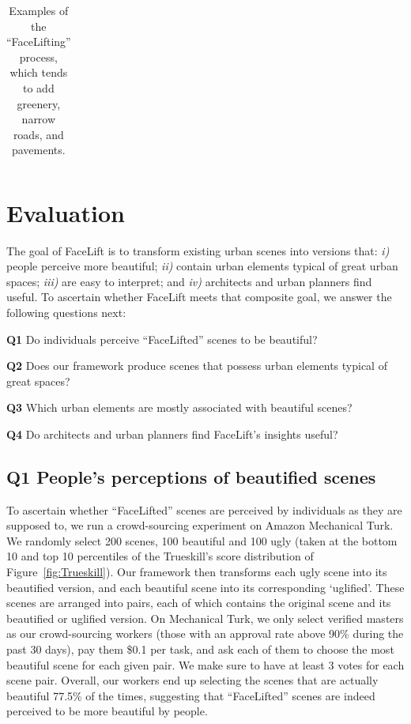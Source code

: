\begin{table}
\begin{tabular}{l*3{C}@{}}
        \bottomrule 
    \end{tabular}
    \caption{Examples of the ``FaceLifting'' process, which tends to add greenery, narrow roads, and  pavements.}
    \label{fig:BeautyExample}
\end{table} 




\section{Evaluation}
\label{sec:evaluation}

The goal of FaceLift is to transform existing urban scenes into versions that: \emph{i)} people perceive more beautiful; \emph{ii)} contain urban elements typical of great urban spaces; \emph{iii)} are easy to interpret; and \emph{iv)} architects and urban planners find useful. To ascertain whether FaceLift meets that composite goal, we answer the following questions next: 

\begin{description}
    \item{\textbf{Q1}} Do individuals perceive ``FaceLifted'' scenes to be beautiful?
    \item{\textbf{Q2}}  Does our framework produce scenes that possess urban elements typical of great spaces?  
    \item{\textbf{Q3}}  Which urban elements are mostly associated with beautiful scenes?    
    \item{\textbf{Q4}}  Do architects and urban planners find FaceLift's insights useful?    
\end{description}


\subsection{Q1 People's perceptions of beautified scenes}
To ascertain whether ``FaceLifted'' scenes are perceived by individuals as they are supposed to, we run a crowd-sourcing experiment on Amazon Mechanical Turk.  We randomly select 200 scenes, 100 beautiful and 100 ugly  (taken at the bottom 10 and top 10 percentiles of the Trueskill's score distribution of Figure~\ref{fig:Trueskill}). Our framework then transforms each ugly scene into its beautified version, and each beautiful scene into its corresponding `uglified'. These scenes are arranged into pairs, each of which contains the original scene and its beautified or uglified version. On  Mechanical Turk, we only select verified masters as our crowd-sourcing workers (those with an approval rate above 90\% during the past 30 days), pay them \$0.1 per  task,  and ask each of them to choose the most beautiful scene for each given pair.  We make sure to have at least 3 votes for each scene pair. Overall, our workers end up selecting the scenes that are actually beautiful 77.5\% of the times, suggesting that ``FaceLifted'' scenes are indeed perceived to be more beautiful by people. 

